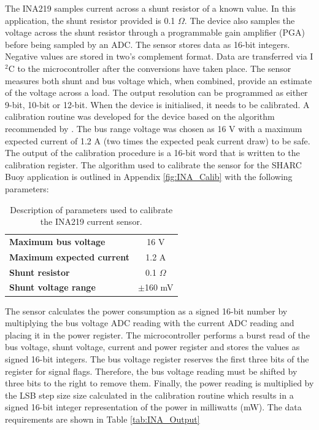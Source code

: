The INA219 samples current across a shunt resistor of a known value. In this application, the shunt resistor provided is 0.1 $\Omega$. The device also samples the voltage across the shunt resistor through a programmable gain amplifier (PGA) before being sampled by an ADC. The sensor stores data as 16-bit integers. Negative values are stored in two's complement format. Data are transferred via I$^2$C to the microcontroller after the conversions have taken place. The sensor measures both shunt and bus voltage which, when combined, provide an estimate of the voltage across a load. The output resolution can be programmed as either 9-bit, 10-bit or 12-bit. When the device is initialised, it needs to be calibrated. A calibration routine was developed for the device based on the algorithm recommended by \textcite{INA219}. The bus range voltage was chosen as 16 V with a maximum expected current of 1.2 A (two times the expected peak current draw) to be safe. The output of the calibration procedure is a 16-bit word that is written to the calibration register. The algorithm used to calibrate the sensor for the SHARC Buoy application is outlined in Appendix \ref{fig:INA_Calib} with the following parameters:
\begin{table}[H]
	\centering
	\caption{ Description of parameters used to calibrate the INA219 current sensor.}
	\setlength{\extrarowheight}{5pt}
	\tiny
	\begin{tabular}{l c}
		\hline
		\hline
		\textbf{Maximum bus voltage}& 16 V \\
	
		\textbf{Maximum expected current} & 1.2 A \\
	
		\textbf{Shunt resistor} & 0.1 $\Omega$ \\
	
		\textbf{Shunt voltage range} & $\pm$160 mV\\
		\hline
		\hline
	\end{tabular}
	
	\label{tab:INA_Calib}
\end{table}

The sensor calculates the power consumption as a signed 16-bit number by multiplying the bus voltage ADC reading with the current ADC reading and placing it in the power register. The microcontroller performs a burst read of the bus voltage, shunt voltage, current and power register and stores the values as signed 16-bit integers. The bus voltage register reserves the first three bits of the register for signal flags. Therefore, the bus voltage reading must be shifted by three bits to the right to remove them. Finally, the power reading is multiplied by the LSB step size size calculated in the calibration routine which results in a signed 16-bit integer representation of the power in milliwatts (mW). The data requirements are shown in Table \ref{tab:INA_Output}

